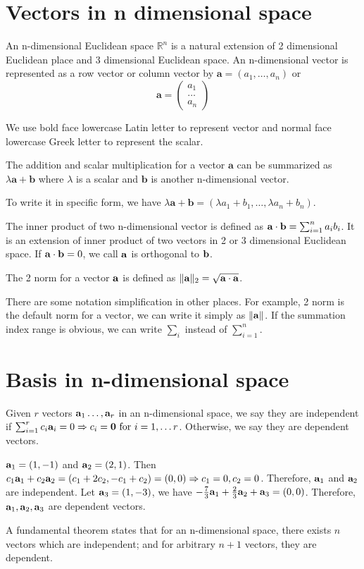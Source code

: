 \section{Vectors in n dimensional space}
An n-dimensional Euclidean space $\mathbb{R}^n$ is a natural extension of 2 dimensional Euclidean place and 3 dimensional Euclidean space. An n-dimensional vector is represented as a row vector or column vector by $\mathbf{a} = (a_1, \dots, a_n)$ or 
$$
\mathbf{a} = \begin{pmatrix} a_1 \\ \dots \\ a_n \end{pmatrix}
$$

We use bold face lowercase Latin letter to represent vector and normal face lowercase Greek letter to represent the scalar.

The addition and scalar multiplication for a vector $\mathbf{a}$ can be summarized as $\lambda \mathbf{a} + \mathbf{b}$ where $\lambda$ is a scalar and $\mathbf{b}$ is another n-dimensional vector.

To write it in specific form, we have $\lambda \mathbf{a} + \mathbf{b} = (\lambda a_1 + b_1, \dots, \lambda a_n + b_n)$.

The inner product of two n-dimensional vector is defined as $\mathbf{a} \cdot \mathbf{b} = \sum_{i=1}^n a_i b_i$. It is an extension of inner product of two vectors in 2 or 3 dimensional Euclidean space. If $\mathbf{a} \cdot \mathbf{b} = 0 $, we call $\mathbf{a}$ is orthogonal to $\mathbf{b}$.

The 2 norm for a vector $\mathbf{a}$ is defined as $\lVert\mathbf{a}\rVert_2 = \sqrt{\mathbf{a}\cdot \mathbf{a}}$.

There are some notation simplification in other places. For example, 2 norm is the default norm for a vector, we can write it simply as $\lVert\mathbf{a}\rVert$. If the summation index range is obvious, we can write $\sum_{i}$ instead of $\sum_{i=1}^n$.

\section{Basis in n-dimensional space}
Given $r$ vectors $\mathbf{a}_1 \dots, \mathbf{a}_r$ in an n-dimensional space, we say they are independent if $ \sum_{i=1}^r c_i \mathbf{a}_i = 0 \Rightarrow c_i = \mathbf{0} \textrm{ for } i=1,\dots r$.
Otherwise, we say they are dependent vectors.
\begin{example}
$\mathbf{a}_1 = (1, -1)$ and $\mathbf{a}_2 = (2, 1)$. Then $c_1 \mathbf{a}_1 + c_2 \mathbf{a}_2 = (c_1 + 2 c_2, -c_1 + c_2 ) = (0,0) \Rightarrow c_1 = 0, c_2 = 0$. Therefore, $\mathbf{a}_1$ and $\mathbf{a}_2$ are independent. Let $\mathbf{a}_3 = (1, -3)$, we have $-\frac{7}{3} \mathbf{a}_1 + \frac{2}{3} \mathbf{a}_2 + \mathbf{a}_3 = (0,0)$. Therefore, $\mathbf{a}_1, \mathbf{a}_2, \mathbf{a}_3$ are dependent vectors.
\end{example}
A fundamental theorem states that for an n-dimensional space, there exists $n$ vectors which are independent; and for arbitrary $n+1$ vectors, they are dependent.


